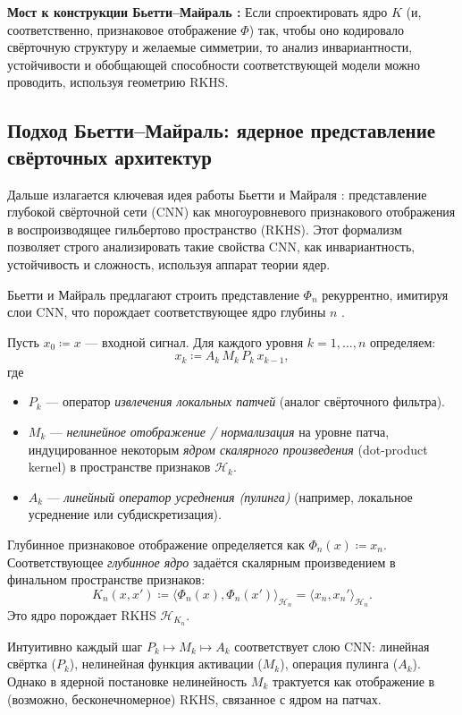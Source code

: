 \documentclass[../NDCNNAI_main.tex]{subfiles}
\begin{document}
\textbf{Мост к конструкции Бьетти--Майраль \cite{Bietti_Group}:} Если спроектировать ядро \(K\) (и, соответственно, признаковое отображение \(\Phi\)) так, чтобы оно кодировало свёрточную структуру и желаемые симметрии, то анализ инвариантности, устойчивости и обобщающей способности соответствующей модели можно проводить, используя геометрию RKHS.

\subsection{Подход Бьетти--Майраль: ядерное представление свёрточных архитектур }
\label{sec:5.2_conv_kernel_view}
Дальше излагается ключевая идея работы Бьетти и Майраля \cite{Bietti_Group}: представление глубокой свёрточной сети (CNN) как многоуровневого признакового отображения в воспроизводящее гильбертово пространство (RKHS). Этот формализм позволяет строго анализировать такие свойства CNN, как инвариантность, устойчивость и сложность, используя аппарат теории ядер.

Бьетти и Майраль предлагают строить представление \(\Phi_n\) рекуррентно, имитируя слои CNN, что порождает соответствующее ядро глубины \(n\) \cite{Bietti_Group}.
\begin{definition}
\label{def:deep_conv_kernel}
Пусть \(x_0 \coloneq x\) --- входной сигнал. Для каждого уровня \(k = 1, \ldots, n\) определяем:
\[
x_k \coloneq A_k \, M_k \, P_k \, x_{k-1},
\]
где
\begin{itemize}
    \item \(P_k\) --- оператор \emph{извлечения локальных патчей} (аналог свёрточного фильтра).
    \item \(M_k\) --- \emph{нелинейное отображение / нормализация} на уровне патча, индуцированное некоторым \emph{ядром скалярного произведения} (dot-product kernel) в пространстве признаков \(\mathcal{H}_k\).
    \item \(A_k\) --- \emph{линейный оператор усреднения (пулинга)} (например, локальное усреднение или субдискретизация).
\end{itemize}
Глубинное признаковое отображение определяется как \(\Phi_n(x) \coloneq x_n\).
Соответствующее \emph{глубинное ядро} задаётся скалярным произведением в финальном пространстве признаков:
\[
K_n(x, x') \coloneq \langle \Phi_n(x), \Phi_n(x')\rangle_{\mathcal{H}_n} = \langle x_n, x_n'\rangle_{\mathcal{H}_n}.
\]
Это ядро порождает RKHS \(\mathcal{H}_{K_n}\).
\end{definition}
Интуитивно каждый шаг \(P_k \mapsto M_k \mapsto A_k\) соответствует слою CNN: линейная свёртка (\(P_k\)), нелинейная функция активации (\(M_k\)), операция пулинга (\(A_k\)). Однако в ядерной постановке нелинейность \(M_k\) трактуется как отображение в (возможно, бесконечномерное) RKHS, связанное с ядром на патчах.
\end{document}
